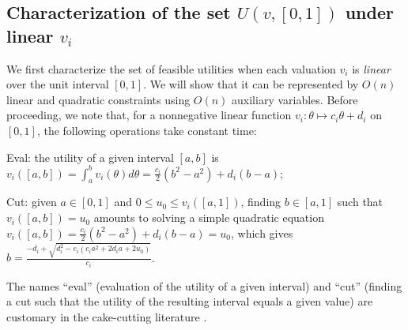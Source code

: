 \subsection{Characterization of the set $U(v, [0,1])$ under linear $v_i$} \label{subseq:charact-linear-vi-[0,1]}
We first characterize the set of feasible utilities when each valuation $v_i$ is \emph{linear} over the unit interval $[0,1]$. 
We will show that it can be represented by $O(n)$ linear and quadratic constraints using $O(n)$ auxiliary variables. Before proceeding, we note that, for a nonnegative linear function $v_i: \theta \mapsto c_i \theta + d_i$ on $[0,1]$, the following operations take constant time:
\begin{enumerate*}[(i)]
	\item Eval: the utility of a given interval $[a,b]$ is 
	$ v_i([a,b]) = \int_a^b v_i(\theta)d\theta = \frac{c_i}{2} (b^2 - a^2) + d_i (b-a)$;
	\item Cut: given $a \in [0,1]$ and $0\leq u_0 \leq v_i([a, 1])$, finding $b\in [a,1]$ such that $v_i([a,b]) = u_0$ amounts to solving a simple quadratic equation
	$v_i([a,b]) = \frac{c_i}{2}(b^2 - a^2) + d_i(b-a) = u_0$, which gives $b = \frac{-d_i + \sqrt{d_i^2 - c_i(c_i a^2 + 2d_ia+2u_0)}}{c_i}$.
\end{enumerate*}
The names ``eval'' (evaluation of the utility of a given interval) and ``cut'' (finding a cut such that the utility of the resulting interval equals a given value) are customary in the cake-cutting literature \citep{procaccia2014cake,robertson1998cake}.

